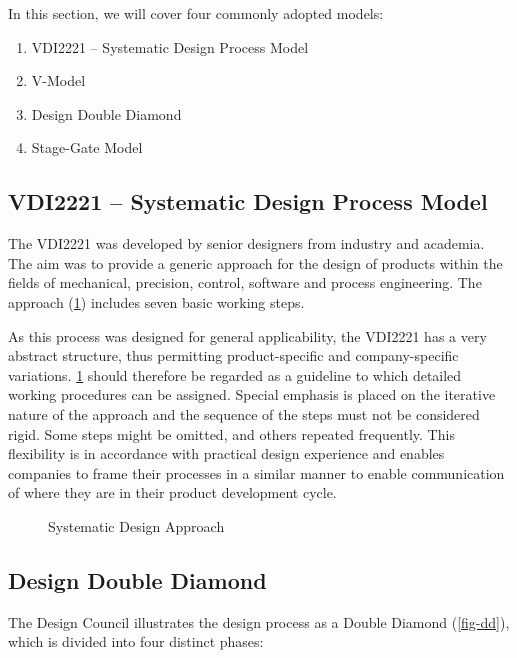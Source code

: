 In this section, we will cover four commonly adopted models:

\begin{enumerate}
  \item VDI2221 -- Systematic Design Process Model
  \item V-Model
  \item Design Double Diamond
  \item Stage-Gate Model
\end{enumerate}

\subsection{VDI2221 -- Systematic Design Process Model}

The \acf{VDI2221} was developed by senior designers from industry and academia. The aim was to provide a generic approach for the design of products within the fields of mechanical, precision, control, software and process engineering. The approach (\cref{fig-vdi}) includes seven basic working steps.

As this process was designed for general applicability, the \ac{VDI2221} has a very abstract structure, thus permitting product-specific and company-specific variations. \cref{fig-vdi} should therefore be regarded as a guideline to which detailed working procedures can be assigned. Special emphasis is placed on the iterative nature of the approach and the sequence of the steps must not be considered rigid. Some steps might be omitted, and others repeated frequently. This flexibility is in accordance with practical design experience and enables companies to frame their processes in a similar manner to enable communication of where they are in their product development cycle.

\begin{figure}[t!]
  \centering
  \resizebox{0.7\textwidth}{!}{
    
  }
  \caption[Systematic Design Approach]{Systematic Design Approach~\citep{pahl2013}}\label{fig-vdi}
\end{figure}


\subsection{Design Double Diamond}

The Design Council\cite{council2007} illustrates the design process as a Double Diamond (\cref{fig-dd}), which is divided into four distinct phases:

